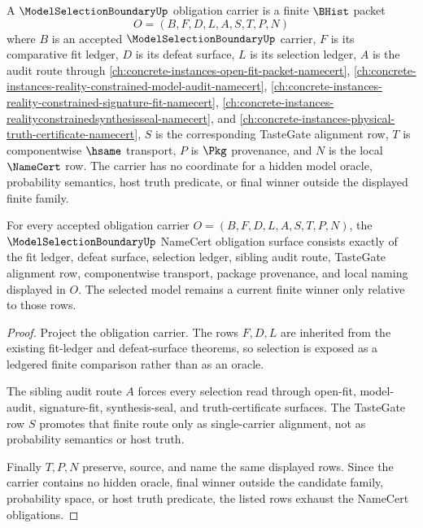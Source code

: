 \begin{definition}
\label{def:modelselectionboundary-obligation-carrier}
A $\ModelSelectionBoundaryUp$ obligation carrier is a finite $\BHist$ packet
$$
O=(B,F,D,L,A,S,T,P,N)
$$
where $B$ is an accepted $\ModelSelectionBoundaryUp$ carrier, $F$ is its comparative fit ledger, $D$ is its defeat surface, $L$ is its selection ledger, $A$ is the audit route through \autoref{ch:concrete-instances-open-fit-packet-namecert}, \autoref{ch:concrete-instances-reality-constrained-model-audit-namecert}, \autoref{ch:concrete-instances-reality-constrained-signature-fit-namecert}, \autoref{ch:concrete-instances-realityconstrainedsynthesisseal-namecert}, and \autoref{ch:concrete-instances-physical-truth-certificate-namecert}, $S$ is the corresponding TasteGate alignment row, $T$ is componentwise $\hsame$ transport, $P$ is $\Pkg$ provenance, and $N$ is the local $\NameCert$ row. The carrier has no coordinate for a hidden model oracle, probability semantics, host truth predicate, or final winner outside the displayed finite family.
\end{definition}

\begin{theorem}
\label{thm:modelselectionboundary-namecert-obligations}
For every accepted obligation carrier $O=(B,F,D,L,A,S,T,P,N)$, the $\ModelSelectionBoundaryUp$ NameCert obligation surface consists exactly of the fit ledger, defeat surface, selection ledger, sibling audit route, TasteGate alignment row, componentwise transport, package provenance, and local naming displayed in $O$. The selected model remains a current finite winner only relative to those rows.
\end{theorem}
\begin{proof}
Project the obligation carrier. The rows $F,D,L$ are inherited from the existing fit-ledger and defeat-surface theorems, so selection is exposed as a ledgered finite comparison rather than as an oracle.

The sibling audit route $A$ forces every selection read through open-fit, model-audit, signature-fit, synthesis-seal, and truth-certificate surfaces. The TasteGate row $S$ promotes that finite route only as single-carrier alignment, not as probability semantics or host truth.

Finally $T,P,N$ preserve, source, and name the same displayed rows. Since the carrier contains no hidden oracle, final winner outside the candidate family, probability space, or host truth predicate, the listed rows exhaust the NameCert obligations.
\end{proof}


